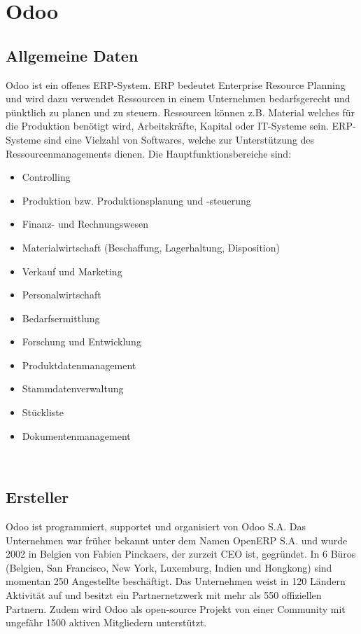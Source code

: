 \section{Odoo}

\subsection{Allgemeine Daten}
Odoo ist ein offenes ERP-System. ERP bedeutet Enterprise Resource Planning und wird dazu verwendet Ressourcen in einem Unternehmen bedarfsgerecht und pünktlich zu planen und zu steuern. Ressourcen können z.B. Material welches für die Produktion benötigt wird, Arbeitskräfte, Kapital oder IT-Systeme sein. ERP-Systeme sind eine Vielzahl von Softwares, welche zur Unterstützung des Ressourcenmanagements dienen. Die Hauptfunktionsbereiche sind:
\begin{itemize}
	\item Controlling
	\item Produktion bzw. Produktionsplanung und -steuerung
	\item Finanz- und Rechnungswesen
	\item Materialwirtschaft (Beschaffung, Lagerhaltung, Disposition)
	\item Verkauf und Marketing
	\item Personalwirtschaft
	\item Bedarfsermittlung
	\item Forschung und Entwicklung
	\item Produktdatenmanagement
	\item Stammdatenverwaltung
	\item Stückliste
	\item Dokumentenmanagement
\end{itemize}
\\

\subsection{Ersteller}
Odoo ist programmiert, supportet und organisiert von Odoo S.A. Das Unternehmen war früher bekannt unter dem Namen OpenERP S.A. und wurde 2002 in Belgien von Fabien Pinckaers, der zurzeit CEO ist, gegründet. In 6 Büros (Belgien, San Francisco, New York, Luxemburg, Indien und Hongkong) sind momentan 250 Angestellte beschäftigt. Das Unternehmen weist in 120 Ländern Aktivität auf und besitzt ein Partnernetzwerk mit mehr als 550 offiziellen Partnern. Zudem wird Odoo als open-source Projekt von einer Community mit ungefähr 1500 aktiven Mitgliedern unterstützt.
\\
